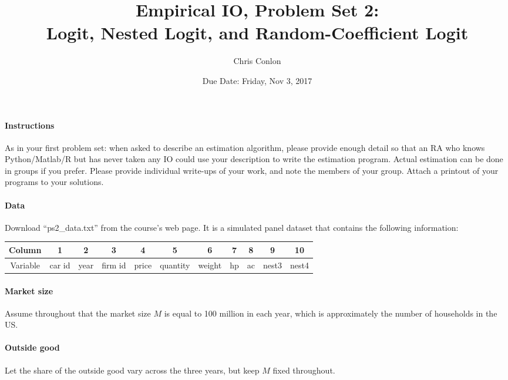 \documentclass[12pt]{article}
\begin{document}
\title{Empirical IO, Problem Set 2:\\
 Logit, Nested Logit, and Random-Coefficient Logit}
\author{Chris Conlon}
\date{Due Date: Friday, Nov 3, 2017}
\maketitle

\paragraph{Instructions} As in your first problem set: when asked to describe an estimation algorithm, please provide enough detail so that an RA who knows Python/Matlab/R but has never taken any IO could use your description to write the estimation program. Actual estimation can be done in groups if you prefer. Please provide individual write-ups of your work, and note the members of your group. Attach a printout of your programs to your solutions.

\paragraph{Data} Download ``ps2\_data.txt'' from the course's web page. It is a simulated panel dataset that contains the following information:

\begin{table}[htb]
\center
\begin{tabular}{|c|c|c|c|c|c|c|c|c|c|c|}
\hline
Column & 1 & 2 & 3 & 4 & 5 & 6 & 7 & 8 & 9 & 10\\ \hline
 Variable & car id & year & firm id & price & quantity & weight & hp & ac & nest3 & nest4\\
\hline
\end{tabular}
\end{table} 
\paragraph{Market size} Assume throughout that the market size $M$ is equal to 100 million in each year, which is approximately the number of households in the US.

\paragraph{Outside good} Let the share of the outside good vary across the three years, but keep $M$ fixed throughout.


\end{document}

